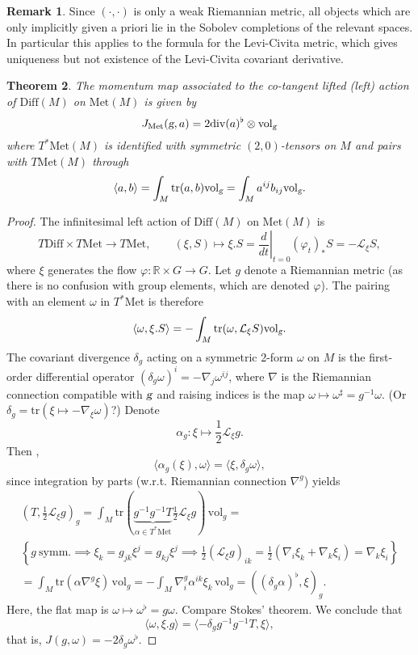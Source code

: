 \documentclass{article}
\theoremstyle{plain}
\newtheorem{teo}{Theorem}[section]
\theoremstyle{definition}
\newtheorem{oss}[teo]{Remark}
\numberwithin{equation}{section}
\newcommand{\R}{\ensuremath{\mathbb{R}}}
\newcommand{\g}{\ensuremath{\textsl{g}}}
\newcommand{\Diff}{\ensuremath{\mathrm{Diff}}}
\newcommand{\Met}{\ensuremath{\mathrm{Met}}}
\newcommand{\Div}{\ensuremath{\mathrm{div}}}
\newcommand{\Vol}{\ensuremath{\mathrm{vol}}}
\newcommand{\lie}{\ensuremath{\mathcal{L}}}
\newcommand{\tr}{\ensuremath{\mathrm{tr}}}
\begin{document}
\begin{oss}
Since $(\cdot,\cdot)$ is only a weak Riemannian metric, all objects which are only implicitly given a priori lie in the Sobolev completions of the relevant spaces. In particular this applies to the formula for the Levi-Civita metric, which gives uniqueness but not existence of the Levi-Civita covariant derivative.
\end{oss}

\begin{teo}
	The momentum map associated to  the co-tangent lifted (left) action  of $\Diff(M)$ on $\Met(M)$ is given by
	\[
	  J_\Met(\g,a)=2\Div (a)^\flat \otimes \Vol_\g  
	\]
	where $T^*\Met(M)$ is identified with  symmetric $(2,0)$-tensors on $M$ and  pairs with $T\Met(M)$ through
	\[
	\langle a,b\rangle = \int_M \tr (a,b)\Vol_\g=\int_M a^{ij}b_{ij}\Vol_\g.
	\]
\end{teo}

\begin{proof}
	The infinitesimal left action of $\Diff(M)$ on $\Met(M)$ is
	\[
	T\Diff\times T\Met\to T\Met,\qquad (\xi,S)\mapsto\xi.S = \left.\frac{d}{dt}\right|_{t=0} (\varphi_t)_*S = -\lie_\xi S,
	\]
	where $\xi$ generates the flow $\varphi :\R\times G \to G$. Let $g$ denote a Riemannian metric (as there is no confusion with group elements, which are denoted $\varphi$). The pairing with an element $\omega$ in $T^*\Met$ is therefore
	\[
	\langle \omega,\xi.S\rangle = -\int_M \tr (\omega,\lie_\xi S)\Vol_\g.
	\]
	The covariant divergence $\delta_g$ acting on a symmetric 2-form $\omega$ on $M$ is the first-order differential operator $(\delta_g\omega)^i=-\nabla_j\omega^{ij}$, where $\nabla$ is the Riemannian connection compatible with $\g$ and raising indices is the map $\omega\mapsto \omega^\sharp=g^{-1}\omega$. (Or $\delta_g=\tr(\xi\mapsto-\nabla_\xi\omega)$?)
	Denote
	\[
	\alpha_g:\xi\mapsto \frac{1}{2}\lie_\xi g.
	\]
	Then \cite{smolentsev2007spaces},
	\[
	\langle\alpha_g(\xi),\omega\rangle=\langle\xi,\delta_g\omega\rangle,
	\]
	since integration by parts (w.r.t. Riemannian connection $\nabla^g$) yields
	\begin{multline*}
	(T,\frac{1}{2}\lie_\xi g)_g=\int_M \tr(\underbrace{g^{-1}g^{-1}T}_{\alpha\in T^*\Met}\frac{1}{2}\lie_\xi g)\,\Vol_g =\\
	\left\{g\ \mathrm{symm.}\implies \xi_k=g_{jk}\xi^j=g_{kj}\xi^j\implies \frac{1}{2}(\lie_\xi g)_{ik}=\frac{1}{2}(\nabla_i\xi_k+\nabla_k\xi_i)=\nabla_k\xi_i\right\}\\
	=\int_M\tr(\alpha \nabla^g\xi)\,\Vol_g=-\int_M \nabla^g_i\alpha^{ik}\xi_k\,\Vol_g=((\delta_g \alpha)^\flat,\xi)_g.
	\end{multline*}
	Here, the flat map is $\omega \mapsto\omega^\flat= g \omega$. Compare Stokes' theorem. We conclude that
	\[
	\langle \omega,\xi.g\rangle=\langle -\delta_g g^{-1}g^{-1}T,\xi\rangle,
	\]
	that is, $J(g,\omega)=-2\delta_g\omega^\flat$.
\end{proof}
\end{document}
